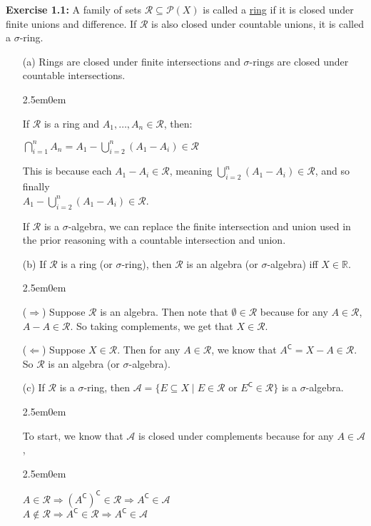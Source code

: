 \documentclass{book}
\newcommand{\exTwoP}{%
   \color{RedViolet}%
   \fontsize{13}{15}\selectfont%
}
\newenvironment{myIndent}{%
   \begin{adjustwidth}{2.5em}{0em}%
}{%
   \end{adjustwidth}%
}
\newcommand{\udefine}[1]{{%
   \setulcolor{Red}%
   \setul{0.14em}{0.07em}%
   \ul{#1}%
}}
\newcommand{\blab}[1]{\textbf{#1}}
\newcommand{\comp}{\mathsf{C}}
\newcommand{\retTwo}{\hfill\bigbreak}
\begin{document}
\blab{Exercise 1.1:} A family of sets $\mathcal{R} \subseteq \mathcal{P}(X)$ is called a \udefine{ring} if it is closed under finite unions and difference. If $\mathcal{R}$ is also closed under countable unions, it is called a $\sigma$-ring.
\begin{enumerate}
   \item[(a)] Rings are closed under finite intersections and $\sigma$-rings are closed under countable intersections.
   
   \begin{myIndent}\exTwoP
      If $\mathcal{R}$ is a ring and $A_1, \ldots, A_n \in \mathcal{R}$, then:\\ [-18pt]
      
      {\centering $\bigcap\limits_{i = 1}^n A_n = A_1 - \bigcup\limits_{i = 2}^n(A_1 - A_i) \in \mathcal{R}$ \retTwo\par}

      This is because each $A_1 - A_i \in \mathcal{R}$, meaning $\bigcup\limits_{i = 2}^n(A_1 - A_i) \in \mathcal{R}$, and so finally\\ [-10pt] $A_1 - \bigcup\limits_{i = 2}^n(A_1 - A_i) \in \mathcal{R}$.\retTwo

      If $\mathcal{R}$ is a $\sigma$-algebra, we can replace the finite intersection and union used in the prior reasoning with a countable intersection and union.\retTwo
   \end{myIndent}
   \item[(b)] If $\mathcal{R}$ is a ring (or $\sigma$-ring), then $\mathcal{R}$ is an algebra (or $\sigma$-algebra) iff $X \in \mathbb{R}$.
   
   \begin{myIndent}\exTwoP
      ($\Longrightarrow$) Suppose $\mathcal{R}$ is an algebra. Then note that $\emptyset \in \mathcal{R}$ because for any $A \in \mathcal{R}$, $A - A \in \mathcal{R}$. So taking complements, we get that $X \in \mathcal{R}$.\retTwo

      ($\Longleftarrow$) Suppose $X \in \mathcal{R}$. Then for any $A \in \mathcal{R}$, we know that $A^\comp = X - A \in \mathcal{R}$. So $\mathcal{R}$ is an algebra (or $\sigma$-algebra).\retTwo
   \end{myIndent}

   \item[(c)] If $\mathcal{R}$ is a $\sigma$-ring, then $\mathcal{A} = \{E \subseteq X \mid E \in \mathcal{R} \text{ or } E^\comp \in \mathcal{R}\}$ is a $\sigma$-algebra.
   
   \begin{myIndent}\exTwoP
      To start, we know that $\mathcal{A}$ is closed under complements because for any $A \in \mathcal{A}$,
      \begin{myIndent}
         $A \in \mathcal{R} \Longrightarrow (A^\comp)^\comp \in \mathcal{R} \Longrightarrow A^\comp \in \mathcal{A}$\\
         $A \notin \mathcal{R} \Longrightarrow A^\comp \in \mathcal{R} \Longrightarrow A^\comp \in \mathcal{A}$\retTwo
      \end{myIndent}


\end{myIndent}
\end{enumerate}
\end{document}

